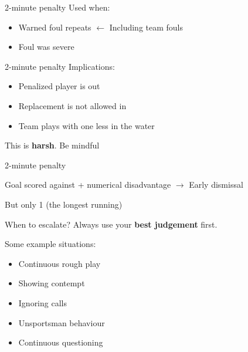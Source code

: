 \documentclass{beamer}
\begin{document}
    \begin{frame}{2-minute penalty}
        Used when:
        \begin{itemize}
            \item Warned foul repeats $\leftarrow$ Including team fouls
            \item Foul was severe
        \end{itemize}
    \end{frame}

    \begin{frame}{2-minute penalty}
        Implications:
        \begin{itemize}
            \item Penalized player is out
            \item Replacement is not allowed in
            \item Team plays with one less in the water
        \end{itemize}

        \pause

        This is \textbf{harsh}. Be mindful
    \end{frame}

    \begin{frame}{2-minute penalty}
        \begin{center}
            Goal scored against + numerical disadvantage $\rightarrow$ Early dismissal

            But only 1 (the longest running)
        \end{center}
    \end{frame}

    \begin{frame}{When to escalate?}
        Always use your \textbf{best judgement} first.

        \pause

        Some example situations:
        \begin{itemize}
            \item Continuous rough play
            \item Showing contempt
            \item Ignoring calls
            \item Unsportsman behaviour
            \item Continuous questioning
        \end{itemize}
    \end{frame}
\end{document}
